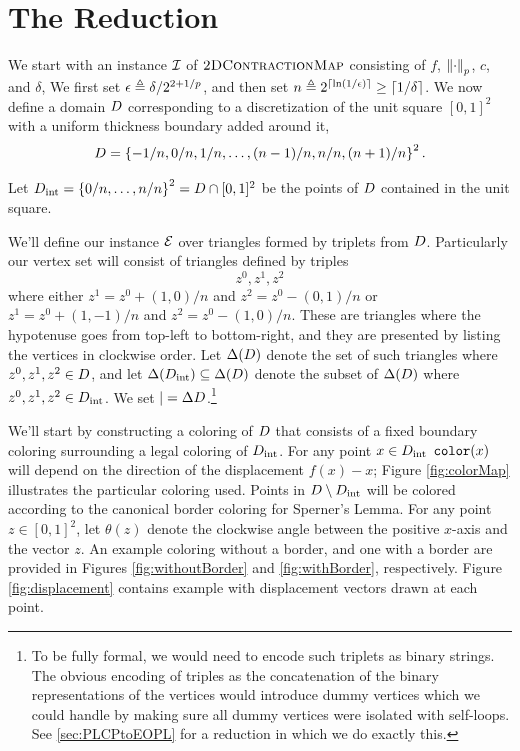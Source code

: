 \section{The Reduction}
We start with an instance $\mbox{${\mathcal I}$}$ of $\textsc{2DContractionMap}$ consisting of $f$, $\left\| \cdot \right\|_p$, $c$, and $\delta$, We first set $\epsilon \triangleq \delta/2^{2+1/p}$, and then set $n \triangleq 2^{\left\lceil \ln(1/\epsilon) \right\rceil} \geq \left\lceil 1/\delta \right\rceil$. We now define a domain $D$ corresponding to a discretization of the unit square $[0,1]^2$ with a uniform thickness boundary added around it,
\[D = \left\{ -1/n,0/n,1/n,\dotsc,(n-1)/n,n/n,(n+1)/n \right\}^2\text{.}\]

Let $D_{\mathrm{int}} = \left\{ 0/n,\dotsc,n/n \right\}^2 = D\cap [0,1]^2$ be the points of $D$ contained in the unit square.

We'll define our \EOPL instance $\mbox{${\mathcal E}$}$ over triangles formed by triplets from $D$.  Particularly our vertex set will consist of triangles defined by triples
  \[z^0,z^1,z^2\] where either $z^1 = z^0 + (1,0)/n$ and $z^2 = z^0 - (0, 1)/n$ or $z^1 = z^0 + (1,-1)/n$ and $z^2 = z^0 - (1,0)/n$. These are triangles where the hypotenuse goes from top-left to bottom-right, and they are presented by listing the vertices in clockwise order. Let $\Delta(D)$ denote the set of such triangles where $z^0,z^1,z^2 \in D$, and let $\Delta(D_{\mathrm{int}}) \subseteq \Delta(D)$ denote the subset of $\Delta(D)$ where $z^0,z^1,z^2 \in D_{\mathrm{int}}$. We set $\vert = \Delta{D}$.\footnote{To be fully formal, we would need to encode such triplets as binary strings. The obvious encoding of triples as the concatenation of the binary representations of the vertices would introduce dummy vertices which we could handle by making sure all dummy vertices were isolated with self-loops. See \ref{sec:PLCPtoEOPL} for a reduction in which we do exactly this.}

  We'll start by constructing a coloring of $D$ that consists of a fixed boundary coloring surrounding a legal coloring of $D_{\mathrm{int}}$. For any point $x \in D_{\mathrm{int}}$ $\operatorname{\texttt{color}}(x)$ will depend on the direction of the displacement $f(x) - x$; Figure \ref{fig:colorMap} illustrates the particular coloring used. Points in $D\setminus D_{\mathrm{int}}$ will be colored according to the canonical border coloring for Sperner's Lemma. For any point $z \in [0,1]^2$, let $\theta(z)$ denote the clockwise angle between the positive $x$-axis and the vector $z$. An example coloring without a border, and one with a border are provided in Figures \ref{fig:withoutBorder} and \ref{fig:withBorder}, respectively. Figure \ref{fig:displacement} contains example with displacement vectors drawn at each point.

